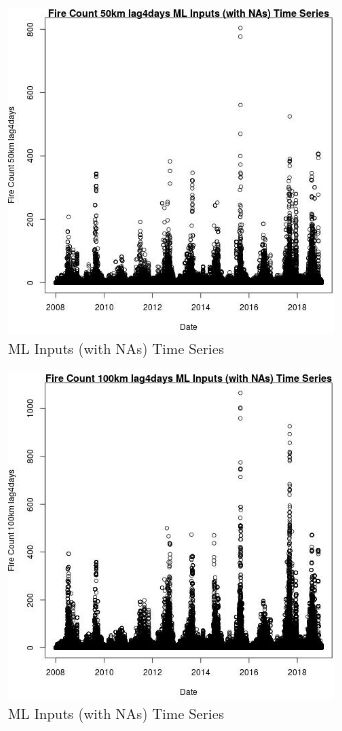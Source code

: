 \begin{figure} 
\centering  
\includegraphics[width=0.77\textwidth]{Code_Outputs/Report_ML_input_PM25_Step4_part_f_de_duplicated_aveswNAs_Fire_Count_50km_lag4daysvDate.jpg} 
\caption{\label{fig:Report_ML_input_PM25_Step4_part_f_de_duplicated_aveswNAsFire_Count_50km_lag4daysvDate}ML Inputs (with NAs) Time Series} 
\end{figure} 
 

\begin{figure} 
\centering  
\includegraphics[width=0.77\textwidth]{Code_Outputs/Report_ML_input_PM25_Step4_part_f_de_duplicated_aveswNAs_Fire_Count_100km_lag4daysvDate.jpg} 
\caption{\label{fig:Report_ML_input_PM25_Step4_part_f_de_duplicated_aveswNAsFire_Count_100km_lag4daysvDate}ML Inputs (with NAs) Time Series} 
\end{figure} 
 

